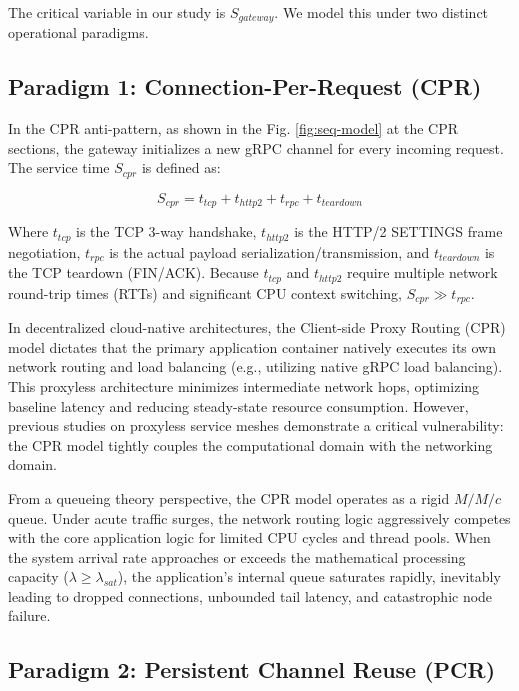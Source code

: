 \documentclass{ieeeaccess}
\begin{document}
The critical variable in our study is $S_{gateway}$. We model this under two distinct operational paradigms.

\subsection{Paradigm 1: Connection-Per-Request (CPR)}
\label{sec2.1}

In the CPR anti-pattern, as shown in the Fig. \ref{fig:seq-model} at the CPR sections, the gateway initializes a new gRPC channel for every incoming request. The service time $S_{cpr}$ is defined as:

\begin{equation}
    S_{cpr} = t_{tcp} + t_{http2} + t_{rpc} + t_{teardown}
\end{equation}

Where $t_{tcp}$ is the TCP 3-way handshake, $t_{http2}$ is the HTTP/2 SETTINGS frame negotiation, $t_{rpc}$ is the actual payload serialization/transmission, and $t_{teardown}$ is the TCP teardown (FIN/ACK). Because $t_{tcp}$ and $t_{http2}$ require multiple network round-trip times (RTTs) and significant CPU context switching, $S_{cpr} \gg t_{rpc}$.

In decentralized cloud-native architectures, the Client-side Proxy Routing (CPR) model dictates that the primary application container natively executes its own network routing and load balancing (e.g., utilizing native gRPC load balancing). This proxyless architecture minimizes intermediate network hops, optimizing baseline latency and reducing steady-state resource consumption. However, previous studies on proxyless service meshes demonstrate a critical vulnerability: the CPR model tightly couples the computational domain with the networking domain.

From a queueing theory perspective, the CPR model operates as a rigid $M/M/c$ queue. Under acute traffic surges, the network routing logic aggressively competes with the core application logic for limited CPU cycles and thread pools. When the system arrival rate approaches or exceeds the mathematical processing capacity ($\lambda \ge  \lambda_{sat}$), the application’s internal queue saturates rapidly, inevitably leading to dropped connections, unbounded tail latency, and catastrophic node failure.

\subsection{Paradigm 2: Persistent Channel Reuse (PCR)}
\label{sec2.2}
\end{document}
